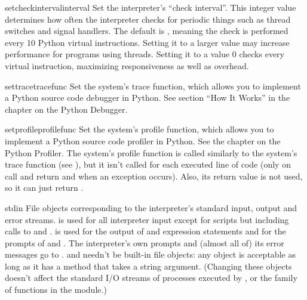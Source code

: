 \begin{funcdesc}{setcheckinterval}{interval}
Set the interpreter's ``check interval''.  This integer value
determines how often the interpreter checks for periodic things such
as thread switches and signal handlers.  The default is , meaning
the check is performed every 10 Python virtual instructions.  Setting
it to a larger value may increase performance for programs using
threads.  Setting it to a value \code{<=} 0 checks every virtual instruction,
maximizing responsiveness as well as overhead.
\end{funcdesc}

\begin{funcdesc}{settrace}{tracefunc}
  Set the system's trace function, which allows you to implement a
  Python source code debugger in Python.  See section ``How It Works''
  in the chapter on the Python Debugger.
\end{funcdesc}

\begin{funcdesc}{setprofile}{profilefunc}
  Set the system's profile function, which allows you to implement a
  Python source code profiler in Python.  See the chapter on the
  Python Profiler.  The system's profile function
  is called similarly to the system's trace function (see
  ), but it isn't called for each executed line of
  code (only on call and return and when an exception occurs).  Also,
  its return value is not used, so it can just return .
\end{funcdesc}

\begin{datadesc}{stdin}
  File objects corresponding to the interpreter's standard input,
  output and error streams.   is used for all
  interpreter input except for scripts but including calls to
   and
  .   is used
  for the output of  and expression statements and for the
  prompts of  and .  The interpreter's
  own prompts and (almost all of) its error messages go to
  .   and  needn't
  be built-in file objects: any object is acceptable as long as it has
  a  method that takes a string argument.  (Changing these
  objects doesn't affect the standard I/O streams of processes
  executed by ,  or the
   family of functions in the  module.)
\end{datadesc}

